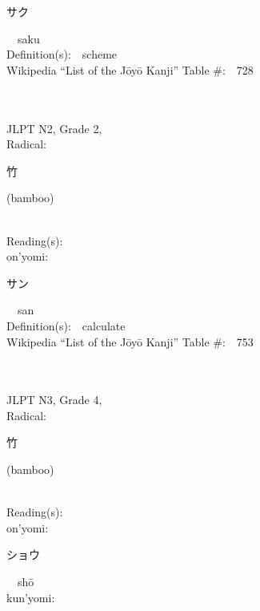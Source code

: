 \begin{multicols}{2}
{\hspace*{2em}}{\begin{CJK}{UTF8}{min} サク \end{CJK}}\ \ saku\ \ \\
Definition(s):\ \ scheme \\
Wikipedia ``List of the J\=oy\=o Kanji'' Table \#:\ \ 728 \\
\ \ \\
{\fontsize{34pt}{40pt}  }\ \ \\  %
{JLPT N2, Grade 2, \\Radical:\ \ {\begin{CJK}{UTF8}{min} 竹 \end{CJK}} (bamboo) } \\
Reading(s):\ \ \\
{\hspace*{1em}}on'yomi:\ \ \\
{\hspace*{2em}}{\begin{CJK}{UTF8}{min} サン \end{CJK}}\ \ san\ \ \\
Definition(s):\ \ calculate \\
Wikipedia ``List of the J\=oy\=o Kanji'' Table \#:\ \ 753 \\
\ \ \\
{\fontsize{34pt}{40pt}  }\ \ \\  %
{JLPT N3, Grade 4, \\Radical:\ \ {\begin{CJK}{UTF8}{min} 竹 \end{CJK}} (bamboo) } \\
Reading(s):\ \ \\
{\hspace*{1em}}on'yomi:\ \ \\
{\hspace*{2em}}{\begin{CJK}{UTF8}{min} ショウ \end{CJK}}\ \ sh\=o\ \ \\
{\hspace*{1em}}kun'yomi:\ \ \\

\end{multicols}
